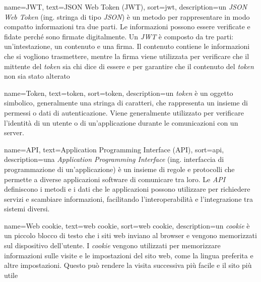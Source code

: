 

 {
    name=JWT,
    text=JSON Web Token (JWT),
    sort=jwt,
    description={un \emph{JSON Web Token} (ing. stringa di tipo \emph{JSON}) è un metodo per rappresentare in modo compatto informazioni tra due parti. Le informazioni possono essere verificate e fidate perché sono firmate digitalmente. Un \emph{JWT} è composto da tre parti: un'intestazione, un contenuto e una firma. Il contenuto contiene le informazioni che si vogliono trasmettere, mentre la firma viene utilizzata per verificare che il mittente del \emph{token} sia chi dice di essere e per garantire che il contenuto del \emph{token} non sia stato alterato}
}

 {
    name=Token,
    text=token,
    sort=token,
    description={un \emph{token} è un oggetto simbolico, generalmente una stringa di caratteri, che rappresenta un insieme di permessi o dati di autenticazione. Viene generalmente utilizzato per verificare l'identità di un utente o di un'applicazione durante le comunicazioni con un server.}
}

 {
    name=API,
    text=Application Programming Interface (API),
    sort=api,
    description={una \emph{Application Programming Interface} (ing. interfaccia di programmazione di un'applicazione) è un insieme di regole e protocolli che permette a diverse applicazioni software di comunicare tra loro. Le \emph{API} definiscono i metodi e i dati che le applicazioni possono utilizzare per richiedere servizi e scambiare informazioni, facilitando l'interoperabilità e l'integrazione tra sistemi diversi.}
}

 {
    name=Web cookie,
    text=web cookie,
    sort=web cookie,
    description={un \emph{cookie} è un piccolo blocco di testo che i siti web inviano al browser e vengono memorizzati sul dispositivo dell'utente. I \emph{cookie} vengono utilizzati per memorizzare informazioni sulle visite e le impostazioni del sito web, come la lingua preferita e altre impostazioni. Questo può rendere la visita successiva più facile e il sito più utile}
}

